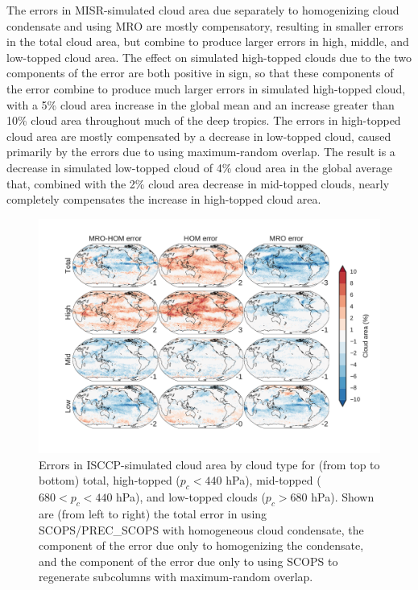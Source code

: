 The errors in MISR-simulated cloud area due separately to homogenizing cloud condensate and using MRO are mostly compensatory, resulting in smaller errors in the total cloud area, but combine to produce larger errors in high, middle, and low-topped cloud area. The effect on simulated high-topped clouds due to the two components of the error are both positive in sign, so that these components of the error combine to produce much larger errors in simulated high-topped cloud, with a 5\% cloud area increase in the global mean and an increase greater than 10\% cloud area throughout much of the deep tropics. The errors in high-topped cloud area are mostly compensated by a decrease in low-topped cloud, caused primarily by the errors due to using maximum-random overlap. The result is a decrease in simulated low-topped cloud of 4\% cloud area in the global average that, combined with the 2\% cloud area decrease in mid-topped clouds, nearly completely compensates the increase in high-topped cloud area. 

\begin{figure}
\centering
\includegraphics[width=\columnwidth]{graphics/subgrid1_cldisccp_maps_diff.pdf}
\caption{Errors in ISCCP-simulated cloud area by cloud type for (from top to bottom) total, high-topped ($p_c < 440$ hPa), mid-topped ($680 < p_c < 440$ hPa), and low-topped clouds ($p_c > 680$ hPa). Shown are (from left to right) the total error in using SCOPS/PREC\_SCOPS with homogeneous cloud condensate, the component of the error due only to homogenizing the condensate, and the component of the error due only to using SCOPS to regenerate subcolumns with maximum-random overlap.}
\label{subgrid1_cldisccp_errors}
\end{figure}

